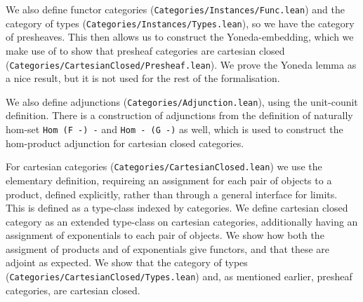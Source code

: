 We also define functor categories
(\texttt{Categories/Instances/Func.lean}) and the category of types
(\texttt{Categories/Instances/Types.lean}), so we have the category of
presheaves. This then allows us to construct the Yoneda-embedding, which
we make use of to show that presheaf categories are cartesian closed
(\texttt{Categories/CartesianClosed/Presheaf.lean}). We prove the Yoneda
lemma as a nice result, but it is not used for the rest of the
formalisation.

We also define adjunctions (\texttt{Categories/Adjunction.lean}), using
the unit-counit definition. There is a construction of adjunctions from
the definition of naturally hom-set \texttt{Hom\ (F\ -)\ -} and
\texttt{Hom\ -\ (G\ -)} as well, which is used to construct the
hom-product adjunction for cartesian closed categories.

For cartesian categories (\texttt{Categories/CartesianClosed.lean}) we
use the elementary definition, requireing an assignment for each pair of
objects to a product, defined explicitly, rather than through a general
interface for limits. This is defined as a type-class indexed by
categories. We define cartesian closed category as an extended
type-class on cartesian categories, additionally having an assignment of
exponentials to each pair of objects. We show how both the assigment of
products and of exponentials give functors, and that these are adjoint
as expected. We show that the category of types
(\texttt{Categories/CartesianClosed/Types.lean}) and, as mentioned
earlier, presheaf categories, are cartesian closed.
